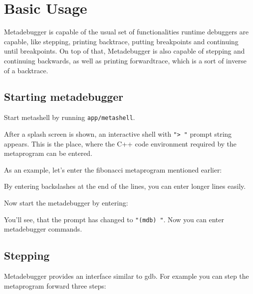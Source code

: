 \section{Basic Usage\cite{github}}

Metadebugger is capable of the usual set of functionalities runtime debuggers
are capable, like stepping, printing backtrace, putting breakpoints and
continuing until breakpoints. On top of that, Metadebugger is also capable of
stepping and continuing backwards, as well as printing forwardtrace, which is
a sort of inverse of a backtrace.

\subsection{Starting metadebugger}

Start metashell by running \texttt{app/metashell}.

\begin{figure}[H]

\end{figure}

After a splash screen is shown, an interactive shell with \texttt{"> "}
prompt string appears. This is the place, where the C++ code environment
required by the metaprogram can be entered.

As an example, let's enter the fibonacci metaprogram mentioned earlier:

\lstset{
    numbers=none
}
\begin{figure}[H]

\end{figure}

By entering backslashes at the end of the lines, you can enter longer lines
easily.

Now start the metadebugger by entering:

\begin{figure}[H]

\end{figure}

You'll see, that the prompt has changed to \texttt{"(mdb) "}. Now you can enter
metadebugger commands.

\subsection{Stepping}

Metadebugger provides an interface similar to gdb\cite{gdb}. For example you
can step the metaprogram forward three steps:

